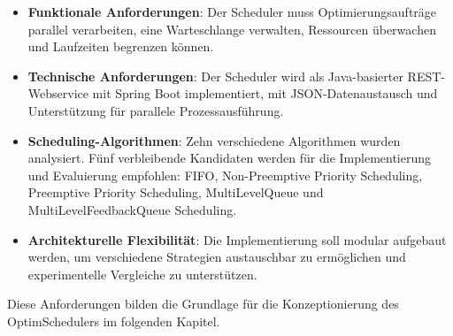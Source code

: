 \begin{itemize}
    \item \textbf{Funktionale Anforderungen}: Der Scheduler muss Optimierungsaufträge parallel verarbeiten, eine Warteschlange verwalten, Ressourcen überwachen und Laufzeiten begrenzen können.
    
    \item \textbf{Technische Anforderungen}: Der Scheduler wird als Java-basierter REST-Webservice mit Spring Boot implementiert, mit JSON-Datenaustausch und Unterstützung für parallele Prozessausführung.
    
    \item \textbf{Scheduling-Algorithmen}: Zehn verschiedene Algorithmen wurden analysiert. Fünf verbleibende Kandidaten werden für die Implementierung und Evaluierung empfohlen: FIFO, Non-Preemptive Priority Scheduling, Preemptive Priority Scheduling, MultiLevelQueue und MultiLevelFeedbackQueue Scheduling.
    
    \item \textbf{Architekturelle Flexibilität}: Die Implementierung soll modular aufgebaut werden, um verschiedene Strategien austauschbar zu ermöglichen und experimentelle Vergleiche zu unterstützen.
\end{itemize}

Diese Anforderungen bilden die Grundlage für die Konzeptionierung des OptimSchedulers im folgenden Kapitel.
